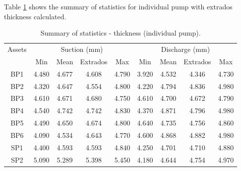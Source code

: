 Table \ref{ch05_tbl_thicknessextra} shows the summary of statistics for individual pump with extrados thickness calculated.
\begin{table}[h]
	\caption{Summary of statistics - thickness (individual pump).}
	\label{ch05_tbl_thicknessextra}
	{\footnotesize
\begin{tabular}{l|l|l|l|l|l|l|l|l}
	\hline
	\multicolumn{1}{c|}{Assets} & \multicolumn{4}{c|}{Suction (mm)} & \multicolumn{4}{c}{Discharge (mm)} \\ 
	\cline{2-9}
	\multicolumn{1}{c|}{} & \multicolumn{1}{c|}{Min} & \multicolumn{1}{c|}{Mean} & \multicolumn{1}{c|}{Extrados} & \multicolumn{1}{c|}{Max} & \multicolumn{1}{c|}{Min} & \multicolumn{1}{c|}{Mean} & \multicolumn{1}{c|}{Extrados} & \multicolumn{1}{c}{Max} \\ 
	\hline
	\multicolumn{1}{c|}{BP1} & \multicolumn{1}{c|}{4.480} & \multicolumn{1}{c|}{4.677} & \multicolumn{1}{c|}{4.608} & \multicolumn{1}{c|}{4.790} & \multicolumn{1}{c|}{3.920} & \multicolumn{1}{c|}{4.532} & \multicolumn{1}{c|}{4.346} & \multicolumn{1}{c}{4.730} \\ 
	\multicolumn{1}{c|}{BP2} & \multicolumn{1}{c|}{4.320} & \multicolumn{1}{c|}{4.647} & \multicolumn{1}{c|}{4.554} & \multicolumn{1}{c|}{4.800} & \multicolumn{1}{c|}{4.220} & \multicolumn{1}{c|}{4.794} & \multicolumn{1}{c|}{4.836} & \multicolumn{1}{c}{4.980} \\ 
	\multicolumn{1}{c|}{BP3} & \multicolumn{1}{c|}{4.610} & \multicolumn{1}{c|}{4.671} & \multicolumn{1}{c|}{4.680} & \multicolumn{1}{c|}{4.750} & \multicolumn{1}{c|}{4.610} & \multicolumn{1}{c|}{4.700} & \multicolumn{1}{c|}{4.672} & \multicolumn{1}{c}{4.790} \\ 
	\multicolumn{1}{c|}{BP4} & \multicolumn{1}{c|}{4.540} & \multicolumn{1}{c|}{4.742} & \multicolumn{1}{c|}{4.742} & \multicolumn{1}{c|}{4.830} & \multicolumn{1}{c|}{4.370} & \multicolumn{1}{c|}{4.871} & \multicolumn{1}{c|}{4.796} & \multicolumn{1}{c}{4.980} \\ 
	\multicolumn{1}{c|}{BP5} & \multicolumn{1}{c|}{4.490} & \multicolumn{1}{c|}{4.650} & \multicolumn{1}{c|}{4.674} & \multicolumn{1}{c|}{4.800} & \multicolumn{1}{c|}{4.640} & \multicolumn{1}{c|}{4.735} & \multicolumn{1}{c|}{4.756} & \multicolumn{1}{c}{4.860} \\ 
	\multicolumn{1}{c|}{BP6} & \multicolumn{1}{c|}{4.090} & \multicolumn{1}{c|}{4.534} & \multicolumn{1}{c|}{4.643} & \multicolumn{1}{c|}{4.770} & \multicolumn{1}{c|}{4.600} & \multicolumn{1}{c|}{4.868} & \multicolumn{1}{c|}{4.882} & \multicolumn{1}{c}{4.980} \\ 
	\multicolumn{1}{c|}{SP1} & \multicolumn{1}{c|}{4.400} & \multicolumn{1}{c|}{4.593} & \multicolumn{1}{c|}{4.593} & \multicolumn{1}{c|}{4.840} & \multicolumn{1}{c|}{4.250} & \multicolumn{1}{c|}{4.701} & \multicolumn{1}{c|}{4.710} & \multicolumn{1}{c}{4.880} \\ 
	\multicolumn{1}{c|}{SP2} & \multicolumn{1}{c|}{5.090} & \multicolumn{1}{c|}{5.289} & \multicolumn{1}{c|}{5.398} & \multicolumn{1}{c|}{5.450} & \multicolumn{1}{c|}{4.180} & \multicolumn{1}{c|}{4.644} & \multicolumn{1}{c|}{4.754} & \multicolumn{1}{c}{4.970} \\ 
	\hline
\end{tabular}

}
\end{table}
